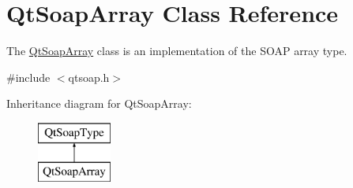 \hypertarget{class_qt_soap_array}{}\section{Qt\+Soap\+Array Class Reference}
\label{class_qt_soap_array}


The \mbox{\hyperlink{class_qt_soap_array}{Qt\+Soap\+Array}} class is an implementation of the S\+O\+AP array type.  




{\ttfamily \#include $<$qtsoap.\+h$>$}

Inheritance diagram for Qt\+Soap\+Array\+:\begin{figure}[H]
\begin{center}
\leavevmode
\includegraphics[height=2.000000cm]{class_qt_soap_array}
\end{center}
\end{figure}
